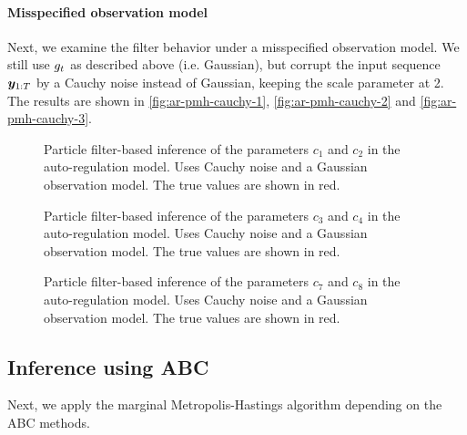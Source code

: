\paragraph{Misspecified observation model}
Next, we examine the filter behavior under a misspecified observation model. We still use $g_t$ as described above (i.e. Gaussian), but corrupt the input sequence $\bm{y}_{1:T}$ by a Cauchy noise instead of Gaussian, keeping the scale parameter at 2. The results are shown in \autoref{fig:ar-pmh-cauchy-1}, \autoref{fig:ar-pmh-cauchy-2} and \autoref{fig:ar-pmh-cauchy-3}.

\begin{figure}[htp]%
    \centering
    \qquad
    \caption{Particle filter-based inference of the parameters $c_1$ and $c_2$ in the auto-regulation model. Uses Cauchy noise and a Gaussian observation model. The true values are shown in red.}%
    \label{fig:ar-pmh-cauchy-1}%
\end{figure}

\begin{figure}[htp]%
    \centering
    \qquad
    \caption{Particle filter-based inference of the parameters $c_3$ and $c_4$ in the auto-regulation model. Uses Cauchy noise and a Gaussian observation model. The true values are shown in red.}%
    \label{fig:ar-pmh-cauchy-2}%
\end{figure}

\begin{figure}[htp]%
    \centering
    \qquad
    \caption{Particle filter-based inference of the parameters $c_7$ and $c_8$ in the auto-regulation model. Uses Cauchy noise and a Gaussian observation model. The true values are shown in red.}%
    \label{fig:ar-pmh-cauchy-3}%
\end{figure}


\subsection{Inference using ABC}
Next, we apply the marginal Metropolis-Hastings algorithm depending on the ABC methods.

